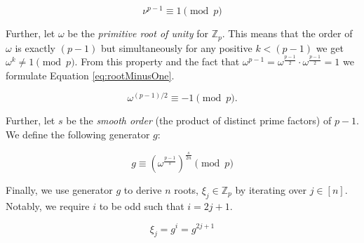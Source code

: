 \begin{equation}
\label{eq:fermatLT}
\nu^{p-1} \equiv 1 \pmod{p}
\end{equation}

Further, let $\omega$ be the \textit{primitive root of unity} for $\mathbb{Z}_p$. This means that the order of $\omega$ is exactly $(p-1)$ but simultaneously for any positive $k < (p-1)$ we get $\omega^k \neq 1 \pmod{p}$. From this property and the fact that $\omega^{p-1} = \omega^{\frac{p-1}{2}} \cdot \omega^{\frac{p-1}{2}} = 1$ we formulate Equation \ref{eq:rootMinusOne}.

\begin{equation}
\label{eq:rootMinusOne}
\omega^{(p-1)/2} \equiv -1 \pmod{p}.
\end{equation}

Further, let $s$ be the \textit{smooth order} (the product of distinct prime factors) of $p-1$. We define the following generator $g$:


\begin{equation}
g \equiv \left(\omega^{\frac{p-1}{s}}\right)^{\frac{s}{2n}}  \pmod{p}
\label{eq:multGroupGen}
\end{equation}

Finally, we use generator $g$ to derive $n$ roots, $\xi_j \in \mathbb{Z}_p$ by iterating over $j \in [n]$. Notably, we require $i$ to be odd such that $i=2j+1$.

\begin{equation}
\label{eq:root_main_equasion}
\xi_j = g^{i} = g^{2j+1}
\end{equation}

